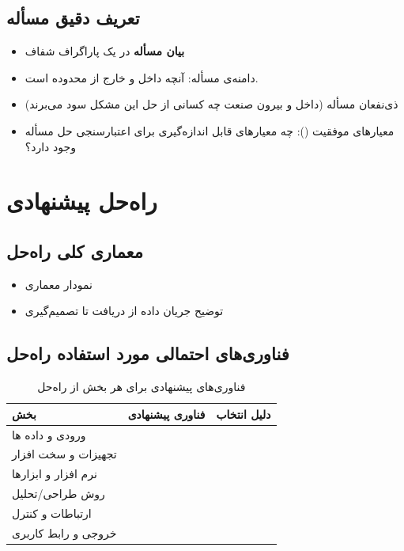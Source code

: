 \documentclass{chamranintern}
\begin{document}
\section{تعریف دقیق مسأله}
\begin{itemize}
  \item \textbf{بیان مسأله} در یک پاراگراف شفاف
  \item دامنه‌ی مسأله: آنچه داخل و خارج از محدوده است.
  \item ذی‌نفعان مسأله (داخل و بیرون صنعت چه کسانی از حل این مشکل سود می‌برند)
  \item معیارهای موفقیت (): چه معیارهای قابل اندازه‌گیری برای اعتبارسنجی حل مسأله وجود دارد؟
\end{itemize}

\chapter{راه‌حل پیشنهادی }
\section{معماری کلی راه‌حل}
\begin{itemize}
  \item نمودار معماری
  \item توضیح جریان داده از دریافت تا تصمیم‌گیری
\end{itemize}

\section{فناوری‌های احتمالی مورد استفاده راه‌حل}
\begin{table}[h]
  \centering
  \caption{فناوری‌های پیشنهادی برای هر بخش از راه‌حل}
  \renewcommand{\arraystretch}{1.6}
  \begin{tabular}{|p{4.0cm}|p{4.4cm}|p{6.2cm}|}
    \hline
    \textbf{بخش} & \textbf{فناوری پیشنهادی} & \textbf{دلیل انتخاب} \\ \hline
    ورودی و داده ها &  &  \\ \hline
    تجهیزات و سخت افزار &  &  \\ \hline
    نرم افزار و ابزارها &  &  \\ \hline
    روش طراحی/تحلیل \ &  &  \\ \hline
    ارتباطات و کنترل &  &  \\ \hline
    خروجی و رابط کاربری &  &  \\ \hline
  \end{tabular}
\end{table}
\end{document}
